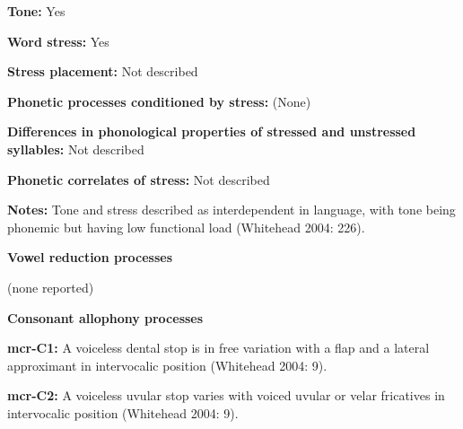 \begin{styleBody}
\textbf{Tone:} Yes
\end{styleBody}

\begin{styleBody}
\textbf{Word stress:} Yes
\end{styleBody}

\begin{styleBody}
\textbf{Stress placement:} Not described
\end{styleBody}

\begin{styleBody}
\textbf{Phonetic processes conditioned by stress:} (None)
\end{styleBody}

\begin{styleBody}
\textbf{Differences in phonological properties of stressed and unstressed syllables:} Not described
\end{styleBody}

\begin{styleBody}
\textbf{Phonetic correlates of stress: }Not described
\end{styleBody}

\begin{styleBody}
\textbf{Notes:} Tone and stress described as interdependent in language, with tone being phonemic but having low functional load (Whitehead 2004: 226). 
\end{styleBody}

\begin{styleBody}
\textbf{Vowel reduction processes}
\end{styleBody}

\begin{styleBody}
(none reported)
\end{styleBody}

\begin{styleBody}
\textbf{Consonant allophony processes}
\end{styleBody}

\begin{styleBody}
\textbf{mcr-C1: }A voiceless dental stop is in free variation with a flap and a lateral approximant in intervocalic position (Whitehead 2004: 9).
\end{styleBody}

\begin{styleBody}
\textbf{mcr-C2: }A voiceless uvular stop varies with voiced uvular or velar fricatives in intervocalic position (Whitehead 2004: 9).
\end{styleBody}

